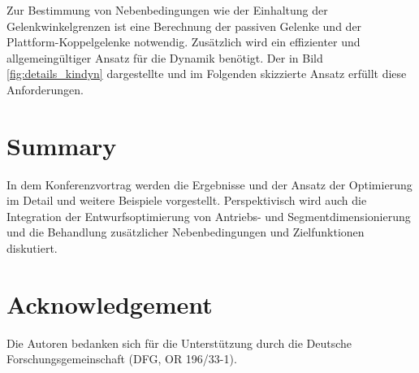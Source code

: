 \documentclass[fleqn,a4paper,10pt]{article}
\begin{document}
\begin{multicols}{2}
\begin{figure*}
	\centering
	
	\label{fig:uebersicht}
\end{figure*}


Zur Bestimmung von Nebenbedingungen wie der Einhaltung der Gelenkwinkelgrenzen ist eine Berechnung der passiven Gelenke und der Plattform-Koppelgelenke notwendig.
Zusätzlich wird ein effizienter und allgemeingültiger Ansatz für die Dynamik benötigt.
Der in Bild\,\ref{fig:details_kindyn} dargestellte und im Folgenden skizzierte  Ansatz erfüllt diese Anforderungen.


\section{Summary}
\label{sec:summary}

In dem Konferenzvortrag werden die Ergebnisse und der Ansatz der Optimierung im Detail und weitere Beispiele vorgestellt.
Perspektivisch wird auch die Integration der Entwurfsoptimierung von Antriebs- und Segmentdimensionierung und die Behandlung zusätzlicher Nebenbedingungen und Zielfunktionen diskutiert.


\section{Acknowledgement}

Die Autoren bedanken sich für die Unterstützung durch die Deutsche Forschungsgemeinschaft (DFG, OR 196/33-1).






\end{multicols}
\end{document}
